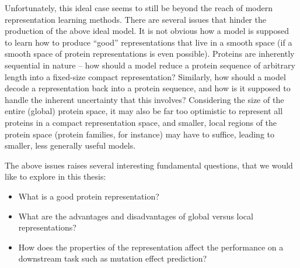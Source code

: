 Unfortunately, this ideal case seems to still be beyond the reach of modern representation learning methods. There are several issues that hinder the production of the above ideal model. It is not obvious how a model is supposed to learn how to produce ``good'' representations that live in a smooth space (if a smooth space of protein representations is even possible). Proteins are inherently sequential in nature -- how should a model reduce a protein sequence of arbitrary length into a fixed-size compact representation? Similarly, how should a model decode a representation back into a protein sequence, and how is it supposed to handle the inherent uncertainty that this involves? Considering the size of the entire (global) protein space, it may also be far too optimistic to represent all proteins in a compact representation space, and smaller, local regions of the protein space (protein families, for instance) may have to suffice, leading to smaller, less generally useful models.

The above issues raises several interesting fundamental questions, that we would like to explore in this thesis:
\begin{itemize}
    \item What is a good protein representation?
    \item What are the advantages and disadvantages of global versus local representations?
    \item How does the properties of the representation affect the performance on a downstream task such as mutation effect prediction?
\end{itemize}




